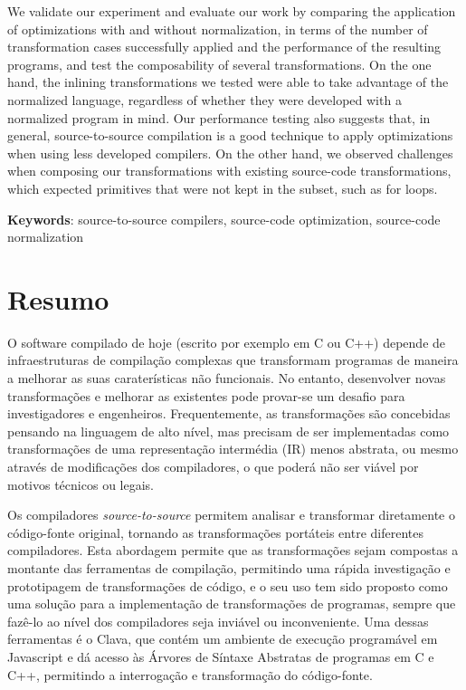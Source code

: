 We validate our experiment and evaluate our work by comparing the application of optimizations with and without normalization, in terms of the number of transformation cases successfully applied and the performance of the resulting programs, and test the composability of several transformations. On the one hand, the inlining transformations we tested were able to take advantage of the normalized language, regardless of whether they were developed with a normalized program in mind. Our performance testing also suggests that, in general, source-to-source compilation is a good technique to apply optimizations when using less developed compilers. On the other hand, we observed challenges when composing our transformations with existing source-code transformations, which expected  primitives that were not kept in the subset, such as for loops.

\vspace*{10mm}\noindent
\textbf{Keywords}: source-to-source compilers, source-code optimization, source-code normalization

\chapter*{Resumo}

O software compilado de hoje (escrito por exemplo em C ou C++) depende de infraestruturas de compilação complexas que transformam programas de maneira a melhorar as suas caraterísticas não funcionais. No entanto, desenvolver novas transformações e melhorar as existentes pode provar-se um desafio para investigadores e engenheiros. Frequentemente, as transformações são concebidas pensando na linguagem de alto nível, mas precisam de ser implementadas como transformações de uma representação intermédia (IR) menos abstrata, ou mesmo através de modificações dos compiladores, o que poderá não ser viável por motivos técnicos ou legais.

Os compiladores \textit{source-to-source} permitem analisar e transformar diretamente o código-fonte original, tornando as transformações portáteis entre diferentes compiladores. Esta abordagem permite que as transformações sejam compostas a montante das ferramentas de compilação, permitindo uma rápida investigação e prototipagem de transformações de código, e o seu uso tem sido proposto como uma solução para a implementação de transformações de programas, sempre que fazê-lo ao nível dos compiladores seja inviável ou inconveniente. Uma dessas ferramentas é o Clava, que contém um ambiente de execução programável em Javascript e dá acesso às Árvores de Síntaxe Abstratas de programas em C e C++, permitindo a interrogação e transformação do código-fonte.

